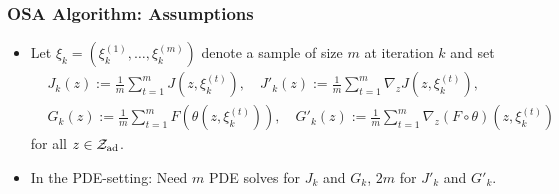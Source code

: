 \documentclass[aspectratio=169,xcolor=dvipsnames,11pt]{beamer}
\newcommand{\eqdef}{:=}
\newcommand{\setZ}{\mathcal{Z}}
\newcommand{\feas}{\setZ_{\rm ad}}
\newcommand{\xibold}{\mathbold{\xi}}
\begin{document}
\begin{footnotesize}
\begin{frame}\frametitle{OSA Algorithm: Assumptions}
\begin{block}{}
\begin{itemize}
\item
Let
$\xi_{k}=(\xi_{k}^{(1)},\ldots,\xi^{(m)}_{k})$ denote a sample of size $m$ at iteration
$k$ and set
\begin{align*}
&J_{k}(z)\eqdef\frac{1}{m}\sum_{t=1}^{m}J(z,{\xi^{(t)}_{k}}),\quad J'_{k}(z)\eqdef\frac{1}{m}\sum_{t=1}^{m}\nabla_z J(z,\xi^{(t)}_{k}),\\
&G_{k}(z)\eqdef\frac{1}{m}\sum_{t=1}^{m}F(\theta(z,\xi^{(t)}_{k})),\quad G'_{k}(z)\eqdef\frac{1}{m}\sum_{t=1}^{m}\nabla_z (F\circ\theta)(z,\xi^{(t)}_{k})
\end{align*}
for all $z\in\feas$. 
\item In the PDE-setting: Need $m$ PDE solves for $J_k$ and $G_k$, $2m$ for $J'_k$ and $G'_k$.
\end{itemize}
\end{block}
\end{frame}


\end{footnotesize}
\end{document}
